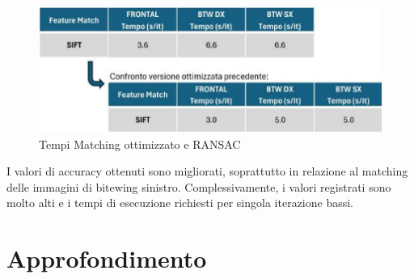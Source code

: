 \documentclass[12pt,a4paper,openright,twoside]{book}
\begin{document}
\begin{figure}[H]
	\centering
	\includegraphics{figures/tempi7_1.pdf}
    	\caption{Tempi Matching ottimizzato e RANSAC}
	\label{fig:tempiransac}
\end{figure}
I valori di accuracy ottenuti sono migliorati, soprattutto in relazione al matching delle immagini di bitewing sinistro. Complessivamente, i valori registrati sono molto alti e i tempi di esecuzione richiesti per singola iterazione bassi.

\chapter{Approfondimento}

\end{document}
